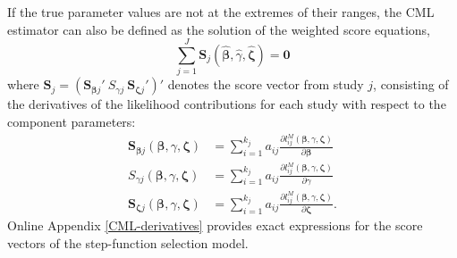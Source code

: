 \documentclass[
  man, donotrepeattitle,floatsintext]{apa7}
\begin{document}
If the true parameter values are not at the extremes of their ranges, the CML estimator can also be defined as the solution of the weighted score equations,
\begin{equation}
\sum_{j=1}^J \mathbf{S}_{j}\left(\boldsymbol{\hat\beta}, \hat\gamma, \boldsymbol{\hat\zeta}\right) = \mathbf{0}
\end{equation}
where \(\mathbf{S}_j = \left(\mathbf{S}_{\boldsymbol\beta j}' \  S_{\gamma j} \ \mathbf{S}_{\boldsymbol\zeta j}'\right)'\) denotes the score vector from study \(j\), consisting of the derivatives of the likelihood contributions for each study with respect to the component parameters:
\begin{align}
\mathbf{S}_{\boldsymbol\beta j}\left(\boldsymbol{\beta}, \gamma, \boldsymbol{\zeta}\right) &= \sum_{i=1}^{k_j} a_{ij} \frac{\partial l^M_{ij}\left(\boldsymbol\beta, \gamma, \boldsymbol\zeta\right)}{\partial \boldsymbol\beta} \label{eq:score-M-beta} \\
S_{\gamma j}\left(\boldsymbol{\beta}, \gamma, \boldsymbol{\zeta}\right) &= \sum_{i=1}^{k_j} a_{ij} \frac{\partial l^M_{ij}\left(\boldsymbol\beta, \gamma, \boldsymbol\zeta\right)}{\partial \gamma} \label{eq:score-M-gamma} \\
\mathbf{S}_{\boldsymbol\zeta j}\left(\boldsymbol{\beta}, \gamma, \boldsymbol{\zeta}\right) &= \sum_{i=1}^{k_j} a_{ij} \frac{\partial l^M_{ij}\left(\boldsymbol\beta, \gamma, \boldsymbol\zeta\right)}{\partial \boldsymbol\zeta}. \label{eq:score-M-zeta} 
\end{align}
Online Appendix \ref{CML-derivatives} provides exact expressions for the score vectors of the step-function selection model.
\end{document}
